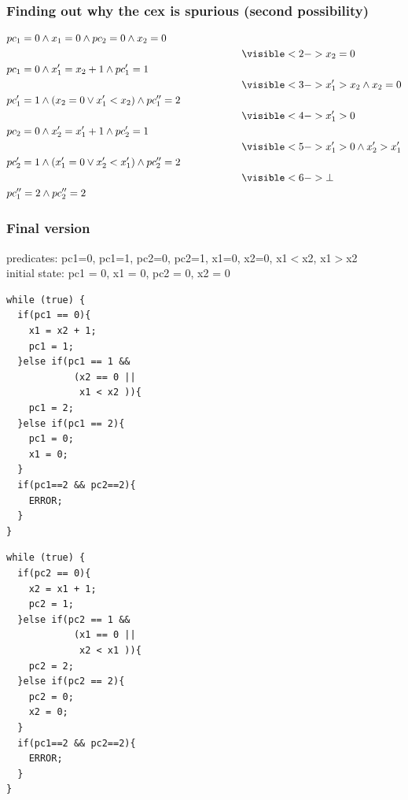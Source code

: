 \documentclass{beamer}
\begin{document}
\begin{frame}
  \frametitle{Finding out why the cex is spurious (second possibility)}

\begin{align*}
& pc_1=0 \land x_1=0 \land pc_2=0 \land x_2=0 \\
& \hspace{8cm} \visible<2->{x_2=0} \\
& pc_1=0 \land x_1' = x_2 + 1 \land pc_1' = 1 \\
& \hspace{8cm} \visible<3->{x_1' > x_2 \land x_2 = 0} \\
& pc_1'=1 \land (x_2=0 \lor x_1'<x_2) \land pc_1'' = 2 \\
& \hspace{8cm} \visible<4->{x_1' > 0}\\
& pc_2=0 \land x_2' = x_1' + 1 \land pc_2' = 1 \\
& \hspace{8cm} \visible<5->{x_1' > 0 \land x_2' > x_1'} \\
& pc_2'=1 \land (x_1'=0 \lor x_2'<x_1') \land pc_2'' = 2 \\
& \hspace{8cm} \visible<6->{\bot}\\
& pc_1''=2 \land pc_2''=2
\end{align*}
\end{frame}

\begin{frame}[fragile]
  \frametitle{Final version}

{\footnotesize
predicates: pc1=0, pc1=1, pc2=0, pc2=1, x1=0, x2=0, x1$<$x2, x1$>$x2\\
initial state: pc1 = 0, x1 = 0, pc2 = 0, x2 = 0
}
\vfill
\begin{minipage}{0.45\linewidth}
\begin{lstlisting}
while (true) {
  if(pc1 == 0){
    x1 = x2 + 1;
    pc1 = 1;
  }else if(pc1 == 1 &&
            (x2 == 0 ||
             x1 < x2 )){
    pc1 = 2;
  }else if(pc1 == 2){
    pc1 = 0;
    x1 = 0;
  }
  if(pc1==2 && pc2==2){
    ERROR;
  }
}
\end{lstlisting}
\end{minipage}
\hfill
\begin{minipage}{0.45\linewidth}
\begin{lstlisting}
while (true) {
  if(pc2 == 0){
    x2 = x1 + 1;
    pc2 = 1;
  }else if(pc2 == 1 &&
            (x1 == 0 ||
             x2 < x1 )){
    pc2 = 2;
  }else if(pc2 == 2){
    pc2 = 0;
    x2 = 0;
  }
  if(pc1==2 && pc2==2){
    ERROR;
  }
}
\end{lstlisting}
\end{minipage}
\end{frame}
\end{document}
